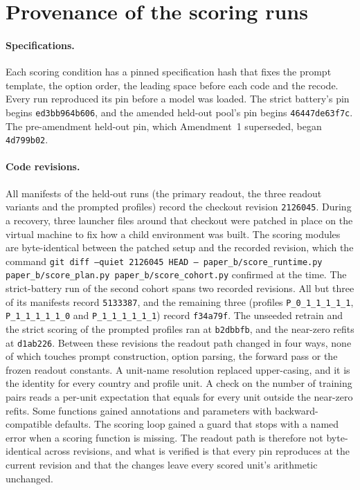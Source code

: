 \documentclass[12pt]{article}
\begin{document}
\section{Provenance of the scoring runs}\label{sec:s-prov}

\paragraph{Specifications.} Each scoring condition has a pinned specification hash that fixes the prompt template, the option order, the leading space before each code and the recode. Every run reproduced its pin before a model was loaded. The strict battery's pin begins \texttt{ed3bb964b606}, and the amended held-out pool's pin begins \texttt{46447de63f7c}. The pre-amendment held-out pin, which Amendment~1 superseded, began \texttt{4d799b02}.

\paragraph{Code revisions.} All manifests of the held-out runs (the primary readout, the three readout variants and the prompted profiles) record the checkout revision \texttt{2126045}. During a recovery, three launcher files around that checkout were patched in place on the virtual machine to fix how a child environment was built. The scoring modules are byte-identical between the patched setup and the recorded revision, which the command \texttt{git diff --quiet 2126045 HEAD -- paper\_b/score\_runtime.py paper\_b/score\_plan.py paper\_b/score\_cohort.py} confirmed at the time. The strict-battery run of the second cohort spans two recorded revisions. All but three of its manifests record \texttt{5133387}, and the remaining three (profiles \texttt{P\_0\_1\_1\_1\_1\_1}, \texttt{P\_1\_1\_1\_1\_1\_0} and \texttt{P\_1\_1\_1\_1\_1\_1}) record \texttt{f34a79f}. The unseeded retrain and the strict scoring of the prompted profiles ran at \texttt{b2dbbfb}, and the near-zero refits at \texttt{d1ab226}. Between these revisions the readout path changed in four ways, none of which touches prompt construction, option parsing, the forward pass or the frozen readout constants. A unit-name resolution replaced upper-casing, and it is the identity for every country and profile unit. A check on the number of training pairs reads a per-unit expectation that equals  for every unit outside the near-zero refits. Some functions gained annotations and parameters with backward-compatible defaults. The scoring loop gained a guard that stops with a named error when a scoring function is missing. The readout path is therefore not byte-identical across revisions, and what is verified is that every pin reproduces at the current revision and that the changes leave every scored unit's arithmetic unchanged.
\end{document}
